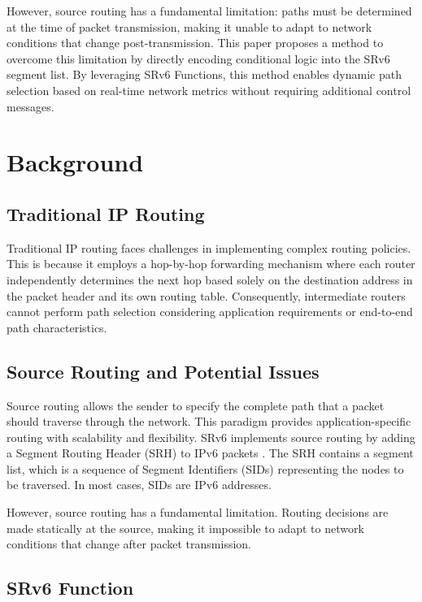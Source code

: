 \documentclass[conference]{IEEEtran}
\begin{document}
However, source routing has a fundamental limitation: paths must be determined at the time of packet transmission, making it unable to adapt to network conditions that change post-transmission.
This paper proposes a method to overcome this limitation by directly encoding conditional logic into the SRv6 segment list.
By leveraging SRv6 Functions, this method enables dynamic path selection based on real-time network metrics without requiring additional control messages.

\section{Background}

\subsection{Traditional IP Routing}

Traditional IP routing faces challenges in implementing complex routing policies. This is because it employs a hop-by-hop forwarding mechanism where each router independently determines the next hop based solely on the destination address in the packet header and its own routing table. Consequently, intermediate routers cannot perform path selection considering application requirements or end-to-end path characteristics.

\subsection{Source Routing and Potential Issues}

Source routing allows the sender to specify the complete path that a packet should traverse through the network.
This paradigm provides application-specific routing with scalability and flexibility. SRv6 implements source routing by adding a Segment Routing Header (SRH) to IPv6 packets \cite{rfc8754}\cite{rfc9256}.
The SRH contains a segment list, which is a sequence of Segment Identifiers (SIDs) representing the nodes to be traversed.
In most cases, SIDs are IPv6 addresses.

However, source routing has a fundamental limitation. Routing decisions are made statically at the source, making it impossible to adapt to network conditions that change after packet transmission.

\subsection{SRv6 Function}
\end{document}
